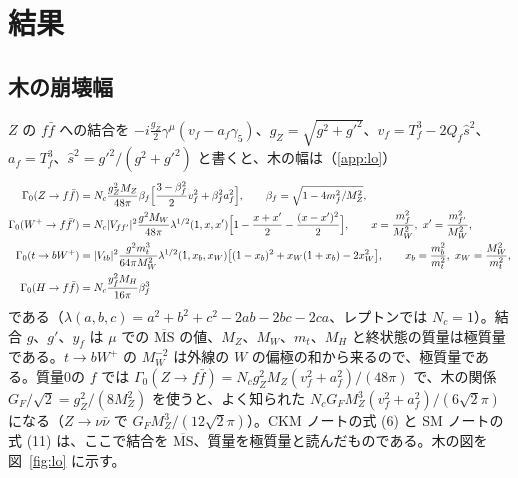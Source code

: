 \documentclass[a4paper,10pt]{ltjsarticle}
\newcommand{\MSbar}{\overline{\mathrm{MS}}}
\begin{document}
\section{結果}\label{sec:results}

\subsection{木の崩壊幅}\label{sec:lo}

$Z$ の $f\bar f$ への結合を $-i\frac{g_Z}2\gamma^\mu(v_f-a_f\gamma_5)$、$g_Z=\sqrt{g^2+g'^2}$、$v_f=T^3_f-2Q_f\hat s^2$、$a_f=T^3_f$、$\hat s^2=g'^2/(g^2+g'^2)$ と書くと、木の幅は（\ref{app:lo}）
\begin{equation}
\begin{aligned}
\Gamma_0(Z\to f\bar f)&=N_c\frac{g_Z^2M_Z}{48\pi}\beta_f\Bigl[\frac{3-\beta_f^2}2v_f^2+\beta_f^2a_f^2\Bigr],\qquad \beta_f=\sqrt{1-4m_f^2/M_Z^2},\\
\Gamma_0(W^+\to f\bar f')&=N_c|V_{ff'}|^2\frac{g^2M_W}{48\pi}\lambda^{1/2}(1,x,x')\Bigl[1-\frac{x+x'}2-\frac{(x-x')^2}2\Bigr],\qquad x=\frac{m_f^2}{M_W^2},\ x'=\frac{m_{f'}^2}{M_W^2},\\
\Gamma_0(t\to bW^+)&=|V_{tb}|^2\frac{g^2m_t^3}{64\pi M_W^2}\lambda^{1/2}(1,x_b,x_W)\bigl[(1-x_b)^2+x_W(1+x_b)-2x_W^2\bigr],\qquad x_b=\frac{m_b^2}{m_t^2},\ x_W=\frac{M_W^2}{m_t^2},\\
\Gamma_0(H\to f\bar f)&=N_c\frac{y_f^2M_H}{16\pi}\beta_f^3
\end{aligned}
\label{eq:lo}
\end{equation}
である（$\lambda(a,b,c)=a^2+b^2+c^2-2ab-2bc-2ca$、レプトンでは $N_c=1$）。結合 $g$、$g'$、$y_f$ は $\mu$ での $\MSbar$ の値、$M_Z$、$M_W$、$m_t$、$M_H$ と終状態の質量は極質量である。$t\to bW^+$ の $M_W^{-2}$ は外線の $W$ の偏極の和から来るので、極質量である。質量0の $f$ では $\Gamma_0(Z\to f\bar f)=N_cg_Z^2M_Z(v_f^2+a_f^2)/(48\pi)$ で、木の関係 $G_F/\sqrt2=g_Z^2/(8M_Z^2)$ を使うと、よく知られた $N_cG_FM_Z^3(v_f^2+a_f^2)/(6\sqrt2\pi)$ になる（$Z\to\nu\bar\nu$ で $G_FM_Z^3/(12\sqrt2\pi)$）。CKM ノートの式 (6) と SM ノートの式 (11) は、ここで結合を $\MSbar$、質量を極質量と読んだものである。木の図を図~\ref{fig:lo} に示す。
\end{document}
